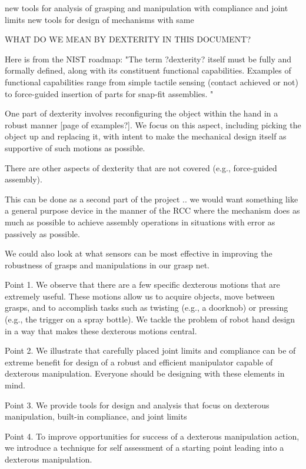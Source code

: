 new tools for analysis of grasping and manipulation with compliance and joint limits
new tools for design of mechanisms with same 



WHAT DO WE MEAN  BY DEXTERITY IN THIS DOCUMENT?

Here is from the NIST roadmap:
"The term ?dexterity? itself must be fully and formally defined, along with its constituent functional capabilities. Examples of functional capabilities range from simple tactile sensing (contact achieved or not) to force-guided insertion of parts for snap-fit assemblies. "

One part of dexterity involves reconfiguring the object within the hand in a robust manner [page of examples?].    We focus on this aspect, including picking the object up and replacing it, with intent to make the mechanical design itself as supportive of such motions as possible.

There are other aspects of dexterity that are not covered (e.g., force-guided assembly).

This can be done as a second part of the project .. we would want something like a general purpose device in the manner of the RCC where the mechanism does as much as possible to achieve assembly operations in situations with error as passively as possible.

We could also look at what sensors can be most effective in improving the robustness of grasps and manipulations in our grasp net.


Point 1.  We observe that there are a few specific dexterous motions that are extremely useful.  These motions allow us to acquire objects, move between grasps, and to accomplish tasks such as twisting (e.g., a doorknob) or pressing (e.g., the trigger on a spray bottle).    We tackle the problem of robot hand design in a way that makes these dexterous motions central.

Point 2.  We illustrate that carefully placed joint limits and compliance can be of extreme benefit for design of a robust and efficient manipulator capable of dexterous manipulation.    Everyone should be designing with these elements in mind.

Point 3.   We provide tools for design and analysis that focus on dexterous manipulation, built-in compliance, and joint limits

Point 4.   To improve opportunities for success of a dexterous manipulation action, we introduce a technique for self assessment of a starting point leading into a dexterous manipulation.


